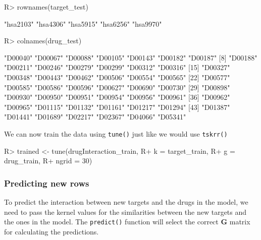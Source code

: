 \documentclass[
]{article}
\begin{document}
\begin{CodeChunk}

\begin{CodeInput}
R> rownames(target_test)
\end{CodeInput}

\begin{CodeOutput}
[1] "hsa2103" "hsa4306" "hsa5915" "hsa6256" "hsa9970"
\end{CodeOutput}

\begin{CodeInput}
R> colnames(drug_test)
\end{CodeInput}

\begin{CodeOutput}
 [1] "D00040" "D00067" "D00088" "D00105" "D00143" "D00182" "D00187"
 [8] "D00188" "D00211" "D00246" "D00279" "D00299" "D00312" "D00316"
[15] "D00327" "D00348" "D00443" "D00462" "D00506" "D00554" "D00565"
[22] "D00577" "D00585" "D00586" "D00596" "D00627" "D00690" "D00730"
[29] "D00898" "D00930" "D00950" "D00951" "D00954" "D00956" "D00961"
[36] "D00962" "D00965" "D01115" "D01132" "D01161" "D01217" "D01294"
[43] "D01387" "D01441" "D01689" "D02217" "D02367" "D04066" "D05341"
\end{CodeOutput}
\end{CodeChunk}

We can now train the data using \texttt{tune()} just like we would use
\texttt{tskrr()}

\begin{CodeChunk}

\begin{CodeInput}
R> trained <- tune(drugInteraction_train,
R+                 k = target_train,
R+                 g = drug_train,
R+                 ngrid = 30)
\end{CodeInput}
\end{CodeChunk}

\hypertarget{predicting-new-rows}{%
\subsubsection{Predicting new rows}\label{predicting-new-rows}}

To predict the interaction between new targets and the drugs in the
model, we need to pass the kernel values for the similarities between
the new targets and the ones in the model. The \texttt{predict()}
function will select the correct \textbf{G} matrix for calculating the
predictions.
\end{document}
